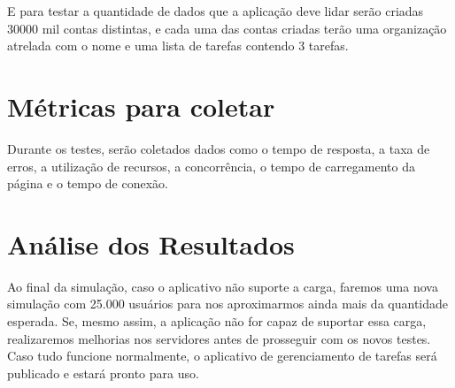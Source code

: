 E para testar a quantidade de dados que a aplicação deve lidar serão criadas 30000 mil contas distintas, e cada uma das contas criadas terão uma organização atrelada com o nome e uma lista de tarefas contendo 3 tarefas.

\section*{Métricas para coletar}
Durante os testes, serão coletados dados como o tempo de resposta, a taxa de erros, a utilização de recursos, a concorrência, o tempo de carregamento da página e o tempo de conexão.

\section*{Análise dos Resultados}

Ao final da simulação, caso o aplicativo não suporte a carga, faremos uma nova simulação com 25.000 usuários para nos aproximarmos ainda mais da quantidade esperada. Se, mesmo assim, a aplicação não for capaz de suportar essa carga, realizaremos melhorias nos servidores antes de prosseguir com os novos testes. Caso tudo funcione normalmente, o aplicativo de gerenciamento de tarefas será publicado e estará pronto para uso.